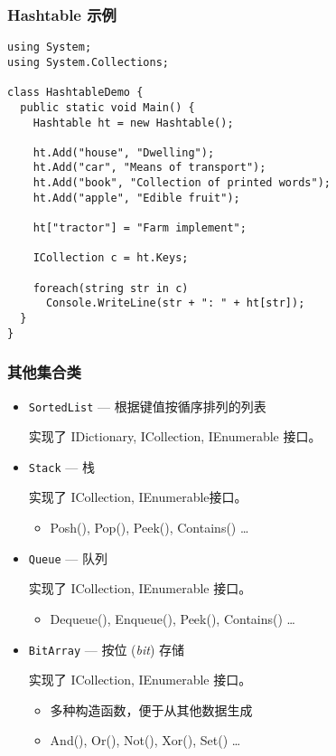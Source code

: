 \begin{frame}
\frametitle{Hashtable 示例}
\begin{lstlisting}
using System;
using System.Collections;

class HashtableDemo {
  public static void Main() {
    Hashtable ht = new Hashtable();

    ht.Add("house", "Dwelling");
    ht.Add("car", "Means of transport");
    ht.Add("book", "Collection of printed words");
    ht.Add("apple", "Edible fruit");

    ht["tractor"] = "Farm implement";

    ICollection c = ht.Keys;

    foreach(string str in c)
      Console.WriteLine(str + ": " + ht[str]);
  }
}
\end{lstlisting}
\end{frame}

\begin{frame}
\frametitle{其他集合类}
\begin{itemize}
\setlength{\itemsep}{8pt plus 1pt}
\item \texttt{SortedList} --- 根据键值按循序排列的列表 \par
\CJKindent \small 实现了 IDictionary, ICollection, IEnumerable 接口。
\item \texttt{Stack}      --- 栈 \par
\CJKindent \small 实现了 ICollection, IEnumerable接口。
\begin{itemize}
\item Posh(), Pop(), Peek(), Contains() \dots
\end{itemize}
\item \texttt{Queue}      --- 队列 \par
\CJKindent \small 实现了 ICollection, IEnumerable 接口。
\begin{itemize}
\item Dequeue(), Enqueue(), Peek(), Contains() \dots
\end{itemize}
\item \texttt{BitArray}   --- 按位 (\textit{bit}) 存储 \par
\CJKindent \small 实现了 ICollection, IEnumerable 接口。
\begin{itemize}
\item 多种构造函数，便于从其他数据生成
\item And(), Or(), Not(), Xor(), Set() \dots
\end{itemize}
\end{itemize}
\end{frame}

